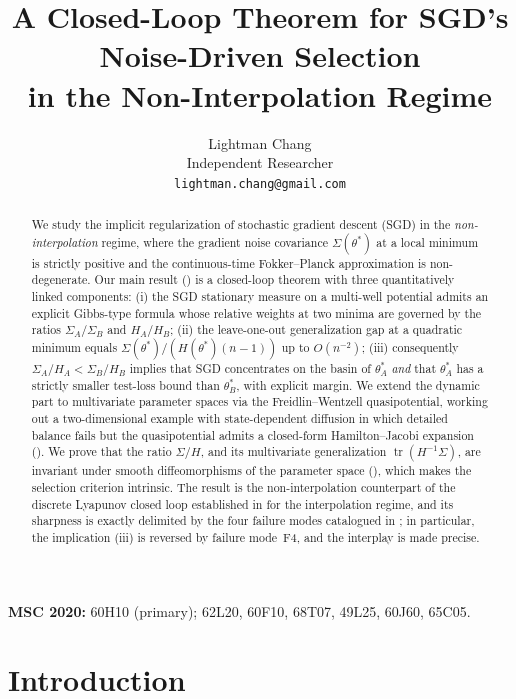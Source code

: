\documentclass[11pt,a4paper]{article}
\title{\Large A Closed-Loop Theorem for SGD's Noise-Driven Selection\\[4pt]
       \large in the Non-Interpolation Regime}
\author{Lightman Chang\\
        Independent Researcher\\
        \texttt{lightman.chang@gmail.com}}
\date{}
\theoremstyle{definition}
\theoremstyle{remark}
\DeclareMathOperator{\tr}{tr}
\begin{document}
\maketitle

\begin{abstract}
We study the implicit regularization of stochastic gradient descent (SGD) in
the \emph{non-interpolation} regime, where the gradient noise covariance
$\Sigma(\theta^*)$ at a local minimum is strictly positive and the
continuous-time Fokker--Planck approximation is non-degenerate.  Our main
result () is a closed-loop theorem with three
quantitatively linked components: (i) the SGD stationary measure on a
multi-well potential admits an explicit Gibbs-type formula whose
relative weights at two minima are governed by the ratios
$\Sigma_A/\Sigma_B$ and $H_A/H_B$; (ii) the leave-one-out generalization gap
at a quadratic minimum equals $\Sigma(\theta^*)/(H(\theta^*)(n-1))$ up to
$O(n^{-2})$; (iii) consequently $\Sigma_A/H_A < \Sigma_B/H_B$ implies that
SGD concentrates on the basin of $\theta_A^*$ \emph{and} that $\theta_A^*$
has a strictly smaller test-loss bound than $\theta_B^*$, with explicit
margin.  We extend the dynamic part to multivariate parameter spaces via the
Freidlin--Wentzell quasipotential, working out a two-dimensional example with
state-dependent diffusion in which detailed balance fails but the
quasipotential admits a closed-form Hamilton--Jacobi expansion
().  We prove that the ratio $\Sigma/H$, and its
multivariate generalization $\tr(H^{-1}\Sigma)$, are invariant under smooth
diffeomorphisms of the parameter space (), which makes
the selection criterion intrinsic.  The result is the non-interpolation
counterpart of the discrete Lyapunov closed loop established in
\cite{paperA} for the interpolation regime, and its sharpness is exactly
delimited by the four failure modes catalogued in \cite{paperB}; in
particular, the implication (iii) is reversed by failure mode~F4, and the
interplay is made precise.
\end{abstract}

\noindent\textbf{MSC 2020:} 60H10 (primary); 62L20, 60F10, 68T07,
49L25, 60J60, 65C05.

\section{Introduction}\label{sec:intro}
\end{document}
